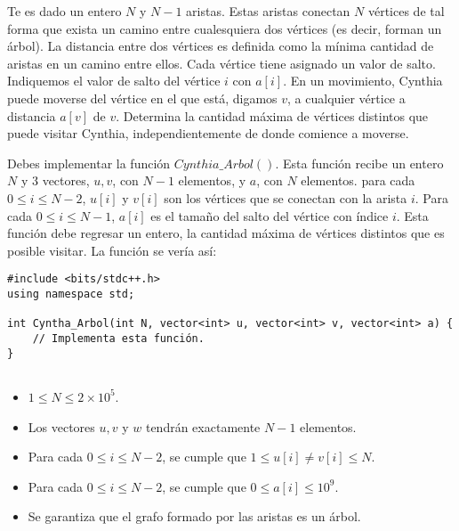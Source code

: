 \documentclass[12pt]{scrartcl}
\begin{document}
    
    
    \vspace{10pt}

    
    
        Te es dado un entero $N$ y $N - 1$ aristas. Estas aristas conectan $N$ vértices de tal forma que exista un camino entre cualesquiera dos vértices (es decir, forman un árbol). La distancia entre dos vértices es definida como la mínima cantidad de aristas en un camino entre ellos. Cada vértice tiene asignado un valor de salto. Indiquemos el valor de salto del vértice $i$ con $a[i]$. En un movimiento, Cynthia puede moverse del vértice en el que está, digamos $v$, a cualquier vértice a distancia $a[v]$ de $v$. Determina la cantidad máxima de vértices distintos que puede visitar Cynthia, independientemente de donde comience a moverse. 
        
        

        Debes implementar la función $Cynthia\_Arbol()$. Esta función recibe un entero $N$ y 3 vectores, $u, v$, con $N - 1$ elementos, y $a$, con $N$ elementos. para cada $0 \le i \le N - 2$, $u[i]$ y $v[i]$ son los vértices que se conectan con la arista $i$. Para cada $0 \le i \le N - 1$, $a[i]$ es el tamaño del salto del vértice con índice $i$. Esta función debe regresar un entero, la cantidad máxima de vértices distintos que es posible visitar.
        La función se vería así:

\begin{verbatim}
#include <bits/stdc++.h>
using namespace std;

int Cyntha_Arbol(int N, vector<int> u, vector<int> v, vector<int> a) {
    // Implementa esta función.
}
    
\end{verbatim}

        \begin{itemize}
            \item $1 \le N \le 2\times10^5$.
            \item Los vectores $u, v$ y $w$ tendrán exactamente $N - 1$ elementos.
            \item Para cada $0 \le i \le N - 2$, se cumple que $1 \le u[i] \neq v[i] \le N$. 
            \item Para cada $0 \le i \le N - 2$, se cumple que $0 \le a[i] \le 10^9$.
            \item Se garantiza que el grafo formado por las aristas es un árbol.
        \end{itemize}
    
\end{document}
